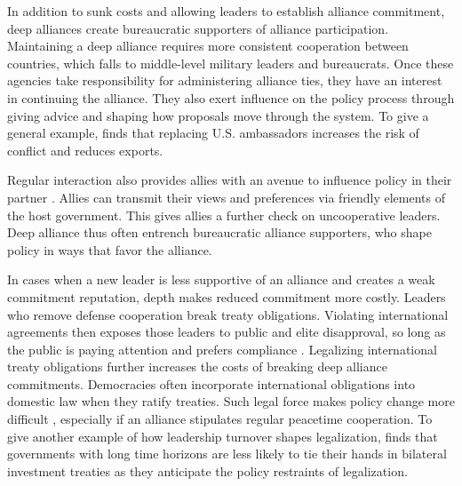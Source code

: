 \documentclass[12pt]{article}
\begin{document}
In addition to sunk costs and allowing leaders to establish alliance commitment, deep alliances create bureaucratic supporters of alliance participation. 
Maintaining a deep alliance requires more consistent cooperation between countries, which falls to middle-level military leaders and bureaucrats. 
Once these agencies take responsibility for administering alliance ties, they have an interest in continuing the alliance. 
They also exert influence on the policy process through giving advice and shaping how proposals move through the system. 
To give a general example, \citet{Malis2021} finds that replacing U.S. ambassadors increases the risk of conflict and reduces exports. 


Regular interaction also provides allies with an avenue to influence policy in their partner \citep{Keohane1971, James2021}.
Allies can transmit their views and preferences via friendly elements of the host government. 
This gives allies a further check on uncooperative leaders.
Deep alliance thus often entrench bureaucratic alliance supporters, who shape policy in ways that favor the alliance. 


In cases when a new leader is less supportive of an alliance and creates a weak commitment reputation, depth makes reduced commitment more costly. 
Leaders who remove defense cooperation break treaty obligations. 
Violating international agreements then exposes those leaders to public and elite disapproval, so long as the public is paying attention \citep{Slantchev2006, PotterBaum2014} and prefers compliance \citep{Chaudoin2014, KertzerBrutger2016}.
Legalizing international treaty obligations further increases the costs of breaking deep alliance commitments. 
Democracies often incorporate international obligations into domestic law when they ratify treaties.
Such legal force makes policy change more difficult \citep{Gaubatz1996, Leedsetal2009}, especially if an alliance stipulates regular peacetime cooperation. 
To give another example of how leadership turnover shapes legalization, \citet{Blake2013} finds that governments with long time horizons are less likely to tie their hands in bilateral investment treaties as they anticipate the policy restraints of legalization. 


\end{document}
